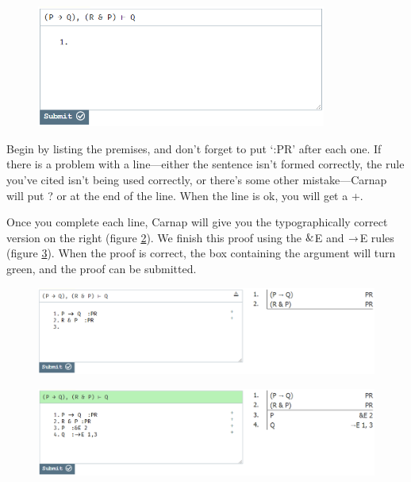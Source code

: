 \begin{figure}
\centering
\includegraphics[height=4cm]{textbook--1a.PNG}
\caption{}
\label{fig:proof-1a}
\end{figure}

Begin by listing the premises, and don't forget to put `:PR' after each one. If there is a problem with a line---either the sentence isn't formed correctly, the rule you've cited isn't being used correctly, or there's some other mistake---Carnap will put \textsf{?} or {\selectfont{}\relax}  at the end of the line. When the line is ok, you will get a +.

Once you complete each line, Carnap will give you the typographically correct version on the right (figure \ref{fig:proof-1b}). We finish this proof using the $\mathbin{\&}$E and $\rightarrow$E rules (figure \ref{fig:proof-1c}). When the proof is correct, the box containing the argument will turn green, and the proof can be submitted. 

\begin{figure}[h]
\includegraphics[width=13cm]{textbook--1b.PNG}
\caption{}
\label{fig:proof-1b}
\end{figure}

\begin{figure}[h]
\includegraphics[width=13cm]{textbook--1c.PNG}
\caption{}
\label{fig:proof-1c}
\end{figure}

